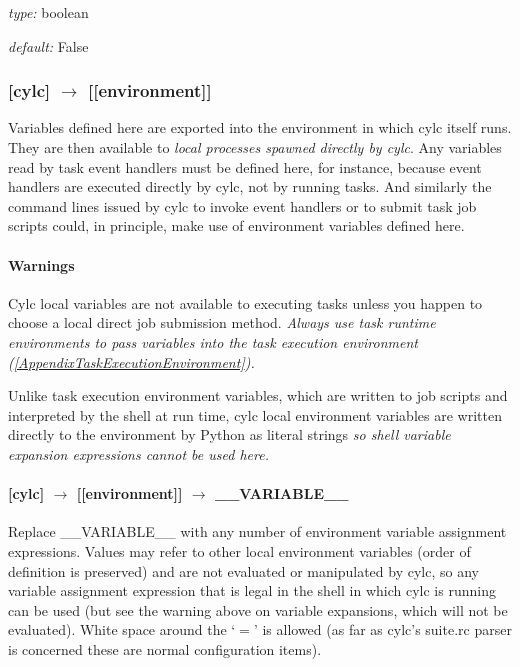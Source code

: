 \begin{myitemize}
    \item {\em type:} boolean
    \item {\em default:} False
\end{myitemize}

\subsubsection[{[[}environment{]]} ]{[cylc] $\rightarrow$ [[environment]]}

Variables defined here are exported into the environment in which cylc
itself runs. They are then available to {\em local processes spawned
directly by cylc}. Any variables read by task event handlers must be
defined here, for instance, because event handlers are executed
directly by cylc, not by running tasks. And similarly the {command
lines} issued by cylc to invoke event handlers or to submit task 
job scripts could, in principle, make use of environment variables
defined here. 
\paragraph{Warnings}

\begin{myitemize}
    \item Cylc local variables are not available to
        executing tasks unless you happen to choose a local direct job
        submission method.  {\em Always use task runtime environments to
        pass variables into the task execution environment
        (\ref{AppendixTaskExecutionEnvironment}).}
    \item Unlike task execution environment variables, which are written
        to job scripts and interpreted by the shell at run time, 
        cylc local environment variables are written directly 
        to the environment by Python as literal strings {\em  so 
        shell variable expansion expressions cannot be used here.}
\end{myitemize}

\paragraph[\_\_VARIABLE\_\_ ]{[cylc] $\rightarrow$ [[environment]] $\rightarrow$ \_\_VARIABLE\_\_}

Replace \_\_VARIABLE\_\_ with any number of environment variable
assignment expressions.
Values may refer to other local environment variables (order of
definition is preserved) and are not evaluated or manipulated by 
cylc, so any variable assignment expression that is legal in the 
shell in which cylc is running can be used (but see the warning 
above on variable expansions, which will not be evaluated).
White space around the `$=$' is allowed (as far as cylc's suite.rc 
parser is concerned these are normal configuration items).

